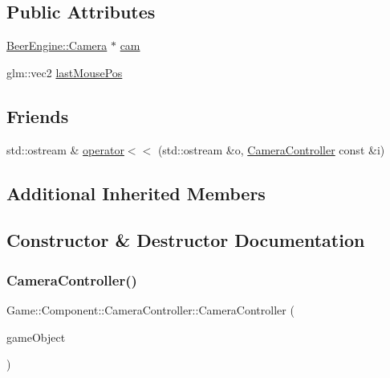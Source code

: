 \subsection*{Public Attributes}
\begin{DoxyCompactItemize}
\item 
\mbox{\hyperlink{class_beer_engine_1_1_camera}{Beer\+Engine\+::\+Camera}} $\ast$ \mbox{\hyperlink{class_game_1_1_component_1_1_camera_controller_a5e619d2b8d42b5b55e743392bdd18ebd}{cam}}
\item 
glm\+::vec2 \mbox{\hyperlink{class_game_1_1_component_1_1_camera_controller_ab87262dadb4c07a9777393d85ad0ed28}{last\+Mouse\+Pos}}
\end{DoxyCompactItemize}
\subsection*{Friends}
\begin{DoxyCompactItemize}
\item 
std\+::ostream \& \mbox{\hyperlink{class_game_1_1_component_1_1_camera_controller_a5746cb5b8916dd3839a38b83018ae1ac}{operator$<$$<$}} (std\+::ostream \&o, \mbox{\hyperlink{class_game_1_1_component_1_1_camera_controller}{Camera\+Controller}} const \&i)
\end{DoxyCompactItemize}
\subsection*{Additional Inherited Members}


\subsection{Constructor \& Destructor Documentation}
\mbox{\label{class_game_1_1_component_1_1_camera_controller_ac9ced75e848e973c4a2f25e25059a4f7}} 
\subsubsection{\texorpdfstring{Camera\+Controller()}{CameraController()}}
{\footnotesize\ttfamily Game\+::\+Component\+::\+Camera\+Controller\+::\+Camera\+Controller (\begin{DoxyParamCaption}\item[{\mbox{\hyperlink{class_beer_engine_1_1_game_object}{Beer\+Engine\+::\+Game\+Object}} $\ast$}]{game\+Object }\end{DoxyParamCaption})}

